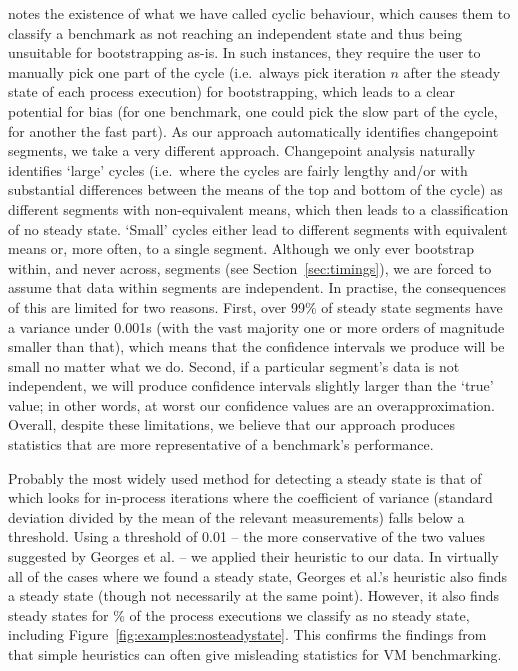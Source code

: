 \documentclass[acmsmall]{acmart}\settopmatter{printfolios=true}
\begin{document}
\cite{kalibera13rigorous} notes the existence of what we have called cyclic behaviour, which
causes them to classify a benchmark as not reaching an independent state and
thus being unsuitable for bootstrapping as-is. In such instances, they require
the user to manually pick one part of the cycle (i.e.~always pick iteration $n$
after the steady state of each process execution) for bootstrapping, which leads
to a clear potential for bias (for one benchmark, one could pick the slow part
of the cycle, for another the fast part). As our approach automatically
identifies changepoint segments, we take a very different approach. Changepoint
analysis naturally identifies `large' cycles (i.e.~where the cycles are fairly
lengthy and/or with substantial differences between the means of the top and
bottom of the cycle) as different segments with non-equivalent means, which then
leads to a classification of no steady state. `Small' cycles either lead to
different segments with equivalent means or, more often, to a single segment.
Although we only ever bootstrap within, and never across, segments (see
Section~\ref{sec:timings}), we are forced to assume that data within segments
are independent. In practise, the consequences of this are limited for two
reasons. First, over 99\% of steady state segments have a variance under 0.001s
(with the vast majority one or more orders of magnitude smaller than that),
which means that the confidence intervals we produce will be small no matter
what we do. Second, if a particular segment's data is not independent, we will
produce confidence intervals slightly larger than the `true' value; in other
words, at worst our confidence values are an overapproximation. Overall,
despite these limitations, we believe that our approach produces statistics
that are more representative of a benchmark's performance.

Probably the most widely used method for detecting a steady state is that of
\citet{georges07statistically} which looks for in-process iterations where the
coefficient of variance (standard deviation divided by the mean of the relevant measurements)
falls below a threshold. Using a threshold of 0.01 -- the more
conservative of the two values suggested by Georges et al. -- we applied their
heuristic to our data. In virtually all of the cases where we found a steady
state, Georges et al.'s heuristic also finds a steady state (though not
necessarily at the same point). However, it also
finds steady states for \georgesnosteadystatepercent\% of the process executions we classify as no
steady state, including Figure~\ref{fig:examples:nosteadystate}. This confirms
the findings from \cite{kalibera13rigorous} that simple heuristics can often
give misleading statistics for VM benchmarking.
\end{document}
